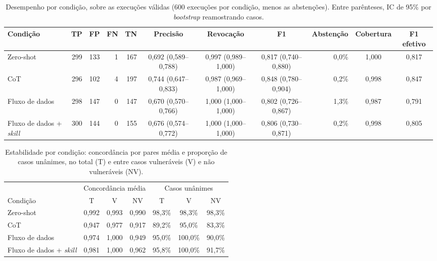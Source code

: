 \begin{table}[t]
\caption{Desempenho por condição, sobre as execuções válidas (600 execuções por condição, menos as abstenções). Entre parênteses, IC de 95\% por \textit{bootstrap} reamostrando casos.}
\label{tab:desempenho}
\small
\begin{tabular}{lrrrrcccrcc}
\toprule
Condição & TP & FP & FN & TN & Precisão & Revocação & F1 & Abstenção & Cobertura & F1 efetivo \\
\midrule
Zero-shot & 299 & 133 & 1 & 167 & 0,692 (0,589--0,788) & 0,997 (0,989--1,000) & 0,817 (0,740--0,880) & 0,0\% & 1,000 & 0,817 \\
CoT & 296 & 102 & 4 & 197 & 0,744 (0,647--0,833) & 0,987 (0,969--1,000) & 0,848 (0,780--0,904) & 0,2\% & 0,998 & 0,847 \\
Fluxo de dados & 298 & 147 & 0 & 147 & 0,670 (0,570--0,766) & 1,000 (1,000--1,000) & 0,802 (0,726--0,867) & 1,3\% & 0,987 & 0,791 \\
Fluxo de dados + \textit{skill} & 300 & 144 & 0 & 155 & 0,676 (0,574--0,772) & 1,000 (1,000--1,000) & 0,806 (0,730--0,871) & 0,2\% & 0,998 & 0,805 \\
\bottomrule
\end{tabular}
\end{table}

\begin{table}[t]
\caption{Estabilidade por condição: concordância por pares média e proporção de casos unânimes, no total (T) e entre casos vulneráveis (V) e não vulneráveis (NV).}
\label{tab:estabilidade}
\small
\setlength{\tabcolsep}{3pt}
\begin{tabular}{lcccccc}
\toprule
 & \multicolumn{3}{c}{Concordância média} & \multicolumn{3}{c}{Casos unânimes} \\
\cmidrule(lr){2-4}\cmidrule(lr){5-7}
Condição & T & V & NV & T & V & NV \\
\midrule
Zero-shot & 0,992 & 0,993 & 0,990 & 98,3\% & 98,3\% & 98,3\% \\
CoT & 0,947 & 0,977 & 0,917 & 89,2\% & 95,0\% & 83,3\% \\
Fluxo de dados & 0,974 & 1,000 & 0,949 & 95,0\% & 100,0\% & 90,0\% \\
Fluxo de dados + \textit{skill} & 0,981 & 1,000 & 0,962 & 95,8\% & 100,0\% & 91,7\% \\
\bottomrule
\end{tabular}
\end{table}

